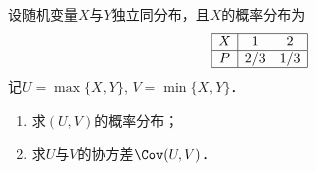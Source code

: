 \documentclass[plain,noanswer,medmath]{../../template/jnuexam}
\begin{document}


\begin{problem}[points=11]
设随机变量$X$与$Y$独立同分布，且$X$的概率分布为
$$\begin{array}{|c|cc|}
\hline
  X &   1 & 2 \\
\hline
  P & 2/3 & 1/3 \\
\hline
\end{array}$$
记$U = \max \{X,Y\}$, $V = \min \{X,Y\}$．
\begin{enumerate}
  \item 求$(U,V)$的概率分布；
  \item 求$U$与$V$的协方差$\Cov(U,V)$．
\end{enumerate}
\end{problem}
\end{document}
